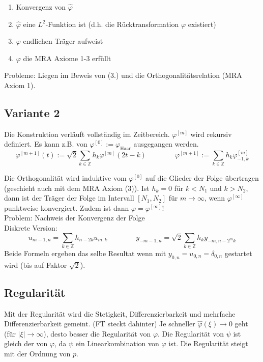 \vspace{-0.4cm}

\begin{enumerate}
	\itemsep-0.2cm
	\item Konvergenz von $\hat{\varphi}$
	\item $\hat{\varphi}$ eine $L^2$-Funktion ist (d.h. die Rücktransformation $\varphi$ existiert)
	\item $\varphi$ endlichen Träger aufweist
	\item $\varphi$ die MRA Axiome 1-3 erfüllt
\end{enumerate}
Probleme: Liegen im Beweis von (3.) und die Orthogonalitätsrelation (MRA Axiom 1).


\subsection{Variante 2}
Die Konstruktion verläuft vollständig im Zeitbereich. $\varphi^{[m]}$ wird rekursiv definiert. Es kann z.B. von $\varphi^{[0]}:=\varphi_{\text{Haar}}$ ausgegangen werden.
\[ 
	\varphi^{[m+1]}(t) := \sqrt{2} \sum_{k \in \mathbb{Z}} h_k \varphi^{[m]}(2t-k) 
	\qquad \qquad
	\varphi^{[m+1]} := \sum_{k \in \mathbb{Z}} h_k \varphi^{[m]}_{-1,k} 
\]

Die Orthogonalität wird induktive vom $\varphi^{[0]}$ auf die Glieder der Folge übertragen (geschieht auch mit dem MRA Axiom (3)).
Ist $h_k=0$ für $k<N_1$ und $k>N_2$, dann ist der Träger der Folge im Intervall $[N_1,N_2]$ für $m\rightarrow\infty$, wenn $\varphi^{[\infty]}$ punktweise konvergiert. Zudem ist dann $\varphi = \varphi^{[\infty]}$!\\

Problem: Nachweis der Konvergenz der Folge\\

Diskrete Version:
\[ 
	u_{m-1,n} = \sum_{k \in \mathbb{Z}} h_{n-2k}u_{m,k}
	\qquad \qquad
	y_{-m-1,n}=\sqrt{2} \sum_{k \in \mathbb{Z}} h_k y_{-m,n-2^mk}
\]
Beide Formeln ergeben das selbe Resultat wenn mit $y_{0,n}=u_{0,n}=\delta_{0,n}$ gestartet wird (bis auf Faktor $\sqrt{2}$).


\subsection{Regularität}
Mit der Regularität wird  die Stetigkeit, Differenzierbarkeit und mehrfache Differenzierbarkeit gemeint. (FT steckt dahinter)
Je schneller $\hat{\varphi}(\xi) \rightarrow 0$ geht (für $|\xi| \rightarrow \infty$), desto besser die Regularität von $\varphi$. Die Regularität von $\psi$ ist gleich der von $\varphi$, da $\psi$ ein Linearkombination von $\varphi$ ist. Die Regularität steigt mit der Ordnung von $p$.\\

